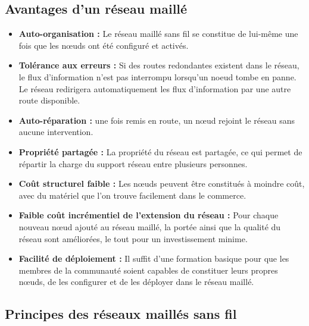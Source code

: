 \documentclass[a4paper,french,11pt,twoside]{article}
\begin{document}
\subsection{Avantages d'un réseau maillé}

\begin{itemize}
\renewcommand{\labelitemi}{$\bullet$}
         \item{\textbf{Auto-organisation :} Le réseau maillé sans fil se constitue de lui-même une fois que les nœuds ont été configuré et activés.}
        \item{\textbf{Tolérance aux erreurs :} Si des routes redondantes existent dans le réseau, le flux d'information n'est pas interrompu lorsqu'un noeud tombe en panne. Le réseau redirigera automatiquement les flux d'information par une autre route disponible.}
    \item{\textbf{Auto-réparation :} une fois remis en route, un nœud rejoint le réseau sans aucune intervention.}
     \item{\textbf{Propriété partagée :} La propriété du réseau est partagée, ce qui permet de répartir la charge du support réseau entre plusieurs personnes.}
    \item{\textbf{Coût structurel faible :} Les nœuds peuvent être constitués à moindre coût, avec du matériel que l'on trouve facilement dans le commerce.}
    \item{\textbf{Faible coût incrémentiel de l'extension du réseau :} Pour chaque nouveau nœud ajouté au réseau maillé, la portée ainsi que la qualité du réseau sont améliorées, le tout pour un investissement minime.}
    \item{\textbf{Facilité de déploiement :} Il suffit d'une formation basique pour que les membres de la communauté soient capables de constituer leurs propres nœuds, de les configurer et de les déployer dans le réseau maillé.}
\end{itemize}

\subsection{Principes des réseaux maillés sans fil}
\end{document}
